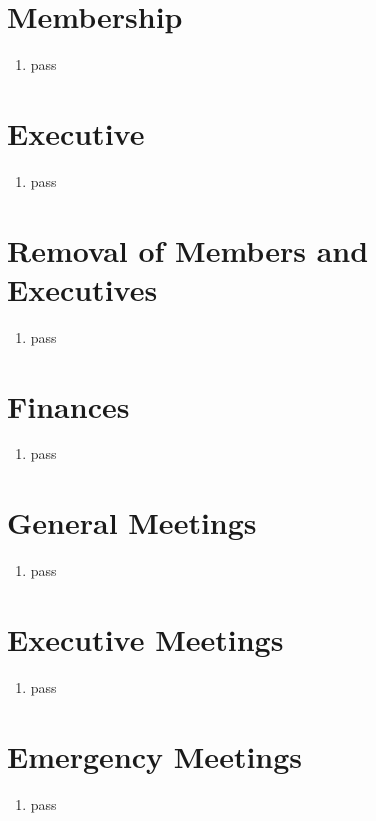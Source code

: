 \documentclass[12pt]{article}
\begin{document}
\section{Membership}
\begin{enumerate}[{3}.1]
    \item pass
\end{enumerate}

\section{Executive}
\begin{enumerate}[{4}.1]
    \item pass
\end{enumerate}

\section{Removal of Members and Executives}
\begin{enumerate}[{5}.1]
    \item pass
\end{enumerate}

\section{Finances}
\begin{enumerate}[{6}.1]
    \item pass
\end{enumerate}

\section{General Meetings}
\begin{enumerate}[{7}.1]
    \item pass
\end{enumerate}

\section{Executive Meetings}
\begin{enumerate}[{8}.1]
    \item pass
\end{enumerate}

\section{Emergency Meetings}
\begin{enumerate}[{9}.1]
    \item pass
\end{enumerate}
\end{document}
